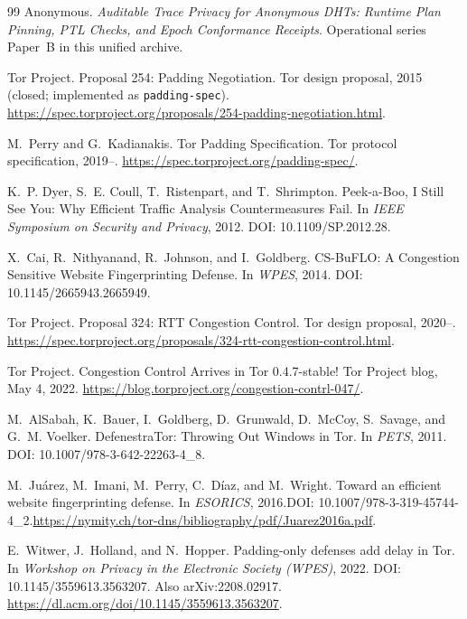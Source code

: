 \documentclass[11pt]{article}
\theoremstyle{definition}
\theoremstyle{remark}
\begin{document}
\begin{thebibliography}{99}
Anonymous.
\newblock \emph{Auditable Trace Privacy for Anonymous DHTs: Runtime Plan Pinning, PTL Checks, and Epoch Conformance Receipts}.
\newblock Operational series Paper~B in this unified archive.

Tor Project.
\newblock Proposal 254: Padding Negotiation.
\newblock Tor design proposal, 2015 (closed; implemented as \texttt{padding-spec}).
\newblock \url{https://spec.torproject.org/proposals/254-padding-negotiation.html}.

M.~Perry and G.~Kadianakis.
\newblock Tor Padding Specification.
\newblock Tor protocol specification, 2019--.
\newblock \url{https://spec.torproject.org/padding-spec/}.

K.~P. Dyer, S.~E. Coull, T.~Ristenpart, and T.~Shrimpton.
\newblock Peek-a-Boo, I Still See You: Why Efficient Traffic Analysis Countermeasures Fail.
\newblock In \emph{IEEE Symposium on Security and Privacy}, 2012.
\newblock DOI: 10.1109/SP.2012.28.

X.~Cai, R.~Nithyanand, R.~Johnson, and I.~Goldberg.
\newblock CS-BuFLO: A Congestion Sensitive Website Fingerprinting Defense.
\newblock In \emph{WPES}, 2014.
\newblock DOI: 10.1145/2665943.2665949.

Tor Project.
\newblock Proposal 324: RTT Congestion Control.
\newblock Tor design proposal, 2020--.
\newblock \url{https://spec.torproject.org/proposals/324-rtt-congestion-control.html}.

Tor Project.
\newblock Congestion Control Arrives in Tor 0.4.7-stable!
\newblock Tor Project blog, May 4, 2022.
\newblock \url{https://blog.torproject.org/congestion-contrl-047/}.

M.~AlSabah, K.~Bauer, I.~Goldberg, D.~Grunwald, D.~McCoy, S.~Savage, and G.~M. Voelker.
\newblock DefenestraTor: Throwing Out Windows in Tor.
\newblock In \emph{PETS}, 2011.
\newblock DOI: 10.1007/978-3-642-22263-4\_8.

M.~Ju\'arez, M.~Imani, M.~Perry, C.~D\'iaz, and M.~Wright.
\newblock Toward an efficient website fingerprinting defense.
\newblock In \emph{ESORICS}, 2016.\newblock DOI: 10.1007/978-3-319-45744-4\_2.\newblock \url{https://nymity.ch/tor-dns/bibliography/pdf/Juarez2016a.pdf}.

E.~Witwer, J.~Holland, and N.~Hopper.
\newblock Padding-only defenses add delay in Tor.
\newblock In \emph{Workshop on Privacy in the Electronic Society (WPES)}, 2022.
\newblock DOI: 10.1145/3559613.3563207. Also arXiv:2208.02917.
\newblock \url{https://dl.acm.org/doi/10.1145/3559613.3563207}.


\end{thebibliography}
\end{document}
